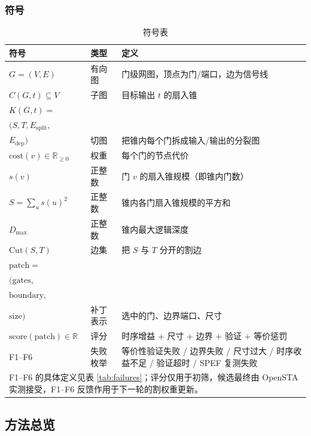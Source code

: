 \documentclass[journal]{IEEEtran}
\begin{document}
\subsubsection{符号}
\begin{table}[!t]
\centering
\caption{符号表}
\label{tab:symbols}
\scriptsize
\setlength{\tabcolsep}{2pt}
\begin{tabular}{p{3.4cm}p{1.5cm}p{3.4cm}}
\toprule
\textbf{符号} & \textbf{类型} & \textbf{定义} \\
\midrule
$G = (V, E)$ & 有向图 & 门级网图，顶点为门/端口，边为信号线 \\
$C(G, t) \subseteq V$ & 子图 & 目标输出 $t$ 的扇入锥 \\
$K(G, t) =$ \\
$(S, T, E_{\mathrm{split}},$ \\
$E_{\mathrm{dep}})$ & 切图 & 把锥内每个门拆成输入/输出的分裂图 \\
$\mathrm{cost}(v) \in \mathbb{R}_{\geq 0}$ & 权重 & 每个门的节点代价 \\
$s(v)$ & 正整数 & 门 $v$ 的扇入锥规模（即锥内门数）\\
$S = \sum_u s(u)^2$ & 正整数 & 锥内各门扇入锥规模的平方和 \\

$D_{\max}$ & 正整数 & 锥内最大逻辑深度 \\
$\mathrm{Cut}(S, T)$ & 边集 & 把 $S$ 与 $T$ 分开的割边 \\
$\mathrm{patch} =$ \\
$(\mathrm{gates},$ \\
$\mathrm{boundary},$ \\
$\mathrm{size})$ & 补丁表示 & 选中的门、边界端口、尺寸 \\
$\mathrm{score}(\mathrm{patch}) \in \mathbb{R}$ & 评分 & 时序增益 + 尺寸 + 边界 + 验证 + 等价惩罚 \\
F1--F6 & 失败枚举 & 等价性验证失败 / 边界失败 / 尺寸过大 / 时序收益不足 / 验证超时 / SPEF 复测失败 \\
\bottomrule
\multicolumn{3}{p{8.0cm}}{\footnotesize F1--F6 的具体定义见表 \ref{tab:failures}；评分仅用于初筛，候选最终由 OpenSTA 实测接受，F1--F6 反馈作用于下一轮的割权重更新。}\\
\end{tabular}
\end{table}

\subsection{方法总览}
\end{document}
